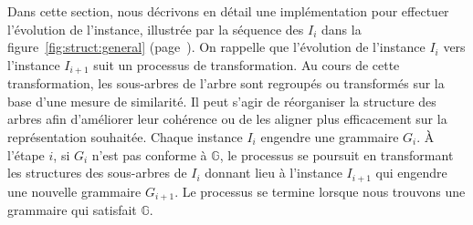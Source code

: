 


Dans cette section, nous décrivons en détail une implémentation pour effectuer l'évolution de l'instance, illustrée par la séquence des $I_i$ dans la figure~\ref{fig:struct:general} (page~\pageref{fig:struct:general}).
On rappelle que l'évolution de l'instance $I_i$ vers l'instance $I_{i+1}$ suit un processus de transformation.
Au cours de cette transformation, les sous-arbres de l'arbre sont regroupés ou transformés sur la base d'une mesure de similarité.
Il peut s'agir de réorganiser la structure des arbres afin d'améliorer leur cohérence ou de les aligner plus efficacement sur la représentation souhaitée.
Chaque instance $I_i$ engendre une grammaire $G_i$.
À l'étape $i$, si $G_i$ n'est pas conforme à $\mathbb{G}$, le processus se poursuit en transformant les structures des sous-arbres de $I_i$ donnant lieu à l'instance $I_{i+1}$ qui engendre une nouvelle grammaire $G_{i+1}$.
Le processus se termine lorsque nous trouvons une grammaire qui satisfait $\mathbb{G}$.

